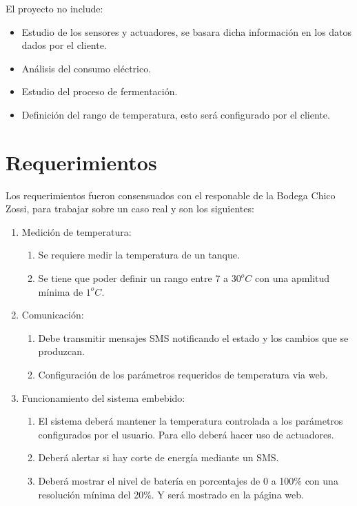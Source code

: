 El proyecto no include:
  \begin{itemize}
    \item Estudio de los sensores y actuadores, se basara dicha información en los datos dados por el cliente. 
    \item Análisis del consumo eléctrico.
    \item Estudio del proceso de fermentación.
    \item Definición del rango de temperatura, esto será configurado por el cliente.
  \end{itemize}

  \section{Requerimientos}

Los requerimientos fueron consensuados con el responable de la Bodega Chico Zossi, para trabajar sobre un caso real y son los siguientes:

\begin{enumerate}[label*=\arabic*.]
  \item Medición de temperatura:
    \begin{enumerate}[label*=\arabic*.]
      \item Se requiere medir la temperatura de un tanque.
      \item Se tiene que poder definir un rango entre $7$ a $30^oC$ con una apmlitud mínima de $1^oC$.
    \end{enumerate}
  \item Comunicación:
    \begin{enumerate}[label*=\arabic*.]
      \item Debe transmitir mensajes SMS notificando el estado y los cambios que se produzcan.
      \item Configuración de los parámetros requeridos de temperatura via web. 
    \end{enumerate}
  \item Funcionamiento del sistema embebido:
    \begin{enumerate}[label*=\arabic*.]
      \item El sistema deberá mantener la temperatura controlada a los parámetros configurados por el usuario. Para ello deberá hacer uso de actuadores.
      \item Deberá alertar si hay corte de energía mediante un SMS.
      \item Deberá mostrar el nivel de batería en porcentajes de 0 a 100\%  con una resolución mínima del 20\%. Y será mostrado en la página web.
  \end{enumerate}
\end{enumerate}


